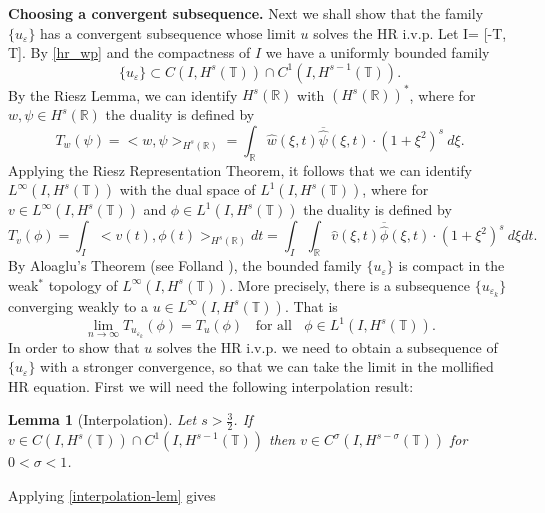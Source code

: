\documentclass[12pt,reqno]{amsart}
\newcommand{\rr}{\mathbb{R}}
\newcommand{\ci}{\mathbb{T}}
\newcommand{\ee}{\varepsilon}
\theoremstyle{plain}  %
\newtheorem{lemma}{Lemma}
\theoremstyle{definition}
\begin{document}
{\bf Choosing  a convergent subsequence.}
%
Next we shall show that  the family $\{ u_\ee\}$ has a convergent 
subsequence
whose limit $u$ solves the HR i.v.p.  Let I= [-T, T]. By  \autoref{hr_wp} and the compactness of $I$ we have a uniformly bounded 
family
%
%
%
\begin{equation*}
\label{Lip-1-fam}
\{u_\ee\}\subset C(I, H^s(\ci))\cap C^1(I,
H^{s-1}(\ci)).
\end{equation*}
%
%
%
%
By the Riesz Lemma, we can identify $H^s(\rr)$ with
$(H^s(\rr))^*$, where for $w, \psi \in H^s(\rr)$ the duality is
defined by 
\begin{equation*}
	T_w(\psi) = <w, \psi>_{H^s(\rr)} = \int_{\rr}
\widehat{w}(\xi, t) \overline{\widehat{\psi}}(\xi, t) \cdot (1
+ \xi^2)^s \ d \xi.
\end{equation*}
Applying the Riesz Representation Theorem, it follows that we 
can identify \\ $L^\infty(I, H^s(\ci)) $ with the dual space of $L^1(I,
H^{s}(\ci))$, where for $v\in L^\infty(I, H^s(\ci)) $ and $ \phi \in
L^1(I, H^{s}(\ci))$ the duality is defined by  
%
%
%
\begin{equation}
T_v(\phi) = \int_I <v (t), \phi (t)>_{H^s(\rr)} dt  = \int_I
\int_{\rr}
\widehat{v}(\xi, t) \overline{\widehat{\phi}}(\xi, t) \cdot (1
+ \xi^2)^s \ d \xi dt.
\end{equation}
%
%
%
By Aloaglu's Theorem (see Folland \cite{Folland_1999_Real-analysis}), the bounded family $\{u_\ee\}$ is compact in the weak$^*$ topology of 
$L^\infty(I, H^s(\ci))$. More precisely,
there is a subsequence  $\{ u_{\ee_k} \}$ converging
weakly to a $ u\in L^{\infty}(I, H^s(\ci))$.
That is 
%
%
%
\begin{equation*}
\label{weak-conv}
\lim_{n\to \infty} T_{u_{\ee_k}}(\phi)  =  T_u (\phi) \; \;		\text{ for 
all } \;\;  \phi \in L^1(I, H^{s}(\ci)).
\end{equation*}
%
%
%
In order to show that $u$ solves the HR i.v.p. we need to obtain a 
subsequence of $\{u_{\ee}\}$ with a stronger convergence, so that we can take 
the limit in the mollified HR equation. First we will need the following 
interpolation result:
%
%
%
%
\begin{lemma}[Interpolation]
\label{interpolation-lem}
Let  $s > \frac{3}{2}$.
If $v \in C(I, H^s(\ci)) \cap C^1(I, H^{s-1}(\ci))$
then $v \in C^\sigma (I, H^{s- \sigma}(\ci))$ for  $0 < \sigma < 1$.
\end{lemma}
%
Applying \autoref{interpolation-lem} gives 
\end{document}

